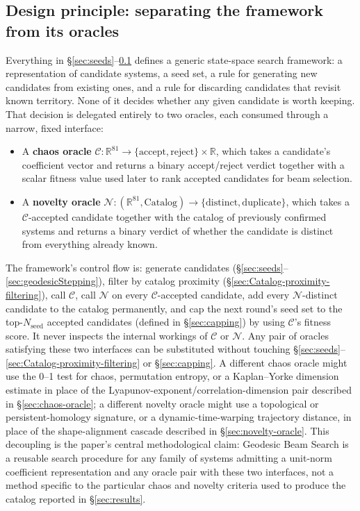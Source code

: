 \documentclass[11pt]{article}
\begin{document}
\subsection{Design principle: separating the framework from its oracles}
\label{sec:modularity}

Everything in \S\ref{sec:seeds}--\ref{sec:modularity} defines a generic
state-space search framework: a representation of candidate systems, a seed
set, a rule for generating new candidates from existing ones, and a rule for
discarding candidates that revisit known territory. None of it decides
whether any given candidate is worth keeping. That decision is delegated
entirely to two oracles, each consumed through a narrow, fixed interface:

\begin{itemize}
  \item A \textbf{chaos oracle}
  $\mathcal{C} : \mathbb{R}^{81} \to \{\mathrm{accept}, \mathrm{reject}\} \times \mathbb{R}$,
  which takes a candidate's coefficient vector and returns a binary
  accept/reject verdict together with a scalar fitness value used later to
  rank accepted candidates for beam selection.
  \item A \textbf{novelty oracle}
  $\mathcal{N} : (\mathbb{R}^{81}, \mathrm{Catalog}) \to \{\mathrm{distinct}, \mathrm{duplicate}\}$,
  which takes a $\mathcal{C}$-accepted candidate together with the catalog of
  previously confirmed systems and returns a binary verdict of whether the
  candidate is distinct from everything already known.
\end{itemize}

The framework's control flow is: generate candidates (\S\ref{sec:seeds}--\ref{sec:geodesicStepping}),
filter by catalog proximity (\S\ref{sec:Catalog-proximity-filtering}), call $\mathcal{C}$, call $\mathcal{N}$ on every
$\mathcal{C}$-accepted candidate, add every $\mathcal{N}$-distinct candidate to the catalog
permanently, and cap the next round's seed set to the top-$N_{\mathrm{seed}}$
accepted candidates (defined in \S\ref{sec:capping}) by using $\mathcal{C}$'s fitness score. It never
inspects the internal workings of $\mathcal{C}$ or $\mathcal{N}$. Any pair of oracles satisfying
these two interfaces can be substituted without touching
\S\ref{sec:seeds}--\ref{sec:Catalog-proximity-filtering} or \S\ref{sec:capping}. A different chaos oracle might
use the 0--1 test for chaos, permutation entropy, or a Kaplan--Yorke
dimension estimate in place of the Lyapunov-exponent/correlation-dimension
pair described in \S\ref{sec:chaos-oracle}; a different novelty oracle might
use a topological or persistent-homology signature, or a dynamic-time-warping
trajectory distance, in place of the shape-alignment cascade described in
\S\ref{sec:novelty-oracle}. This decoupling is the paper's central
methodological claim: Geodesic Beam Search is a reusable search procedure for
any family of systems admitting a unit-norm coefficient representation and
any oracle pair with these two interfaces, not a method specific to the
particular chaos and novelty criteria used to produce the catalog reported in
\S\ref{sec:results}.
\end{document}
